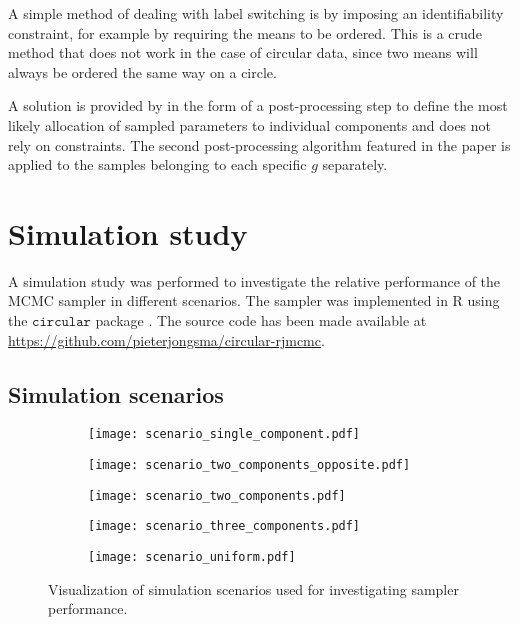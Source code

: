A simple method of dealing with label switching is by imposing an identifiability constraint, for example by requiring the means to be ordered. This is a crude method that does not work in the case of circular data, since two means will always be ordered the same way on a circle.

A solution is provided by \citet{Stephens:2000gba} in the form of a post-processing step to define the most likely allocation of sampled parameters to individual components and does not rely on constraints. The second post-processing algorithm featured in the paper is applied to the samples belonging to each specific $g$ separately.

\section{Simulation study}
\label{simulations}

A simulation study was performed to investigate the relative performance of the MCMC sampler in different scenarios. The sampler was implemented in R \citep{rlanguage} using the $\texttt{circular}$ package \citep{rcircular}. The source code has been made available at \url{https://github.com/pieterjongsma/circular-rjmcmc}.

\subsection{Simulation scenarios}

\begin{figure}
	\captionsetup[subfigure]{justification=centering}
	\centering
	\begin{subfigure}[b]{0.18\textwidth}
		\texttt{[image: scenario\_single\_component.pdf]}
		\caption{}
		\label{fig:simulation-scenarios:single}
	\end{subfigure}
	\begin{subfigure}[b]{0.18\textwidth}
		\texttt{[image: scenario\_two\_components\_opposite.pdf]}
		\caption{}
		\label{fig:simulation-scenarios:two-opposite}
	\end{subfigure}
	\begin{subfigure}[b]{0.18\textwidth}
		\texttt{[image: scenario\_two\_components.pdf]}
		\caption{}
		\label{fig:simulation-scenarios:two}
	\end{subfigure}
	\begin{subfigure}[b]{0.18\textwidth}
		\texttt{[image: scenario\_three\_components.pdf]}
		\caption{}
		\label{fig:simulation-scenarios:three}
	\end{subfigure}
	\begin{subfigure}[b]{0.18\textwidth}
		\texttt{[image: scenario\_uniform.pdf]}
		\caption{}
		\label{fig:simulation-scenarios:uniform}
	\end{subfigure}
	\caption{Visualization of simulation scenarios used for investigating sampler performance.}
	\label{fig:simulation-scenarios}
\end{figure}

